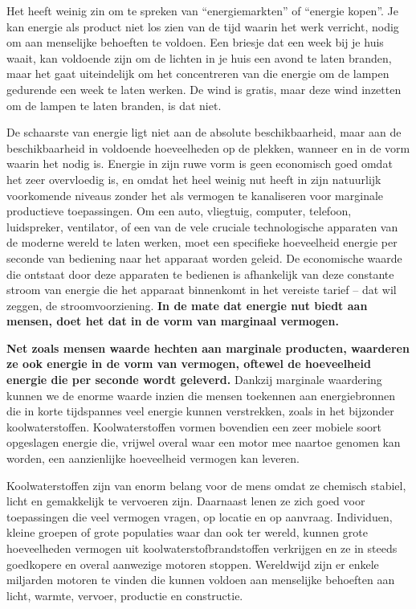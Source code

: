 Het heeft weinig zin om te spreken van ``energiemarkten'' of ``energie kopen''. Je kan energie als product niet los zien van de tijd waarin het werk verricht, nodig om aan menselijke behoeften te voldoen. Een briesje dat een week bij je huis waait, kan voldoende zijn om de lichten in je huis een avond te laten branden, maar het gaat uiteindelijk om het concentreren van die energie om de lampen gedurende een week te laten werken. De wind is gratis, maar deze wind inzetten om de lampen te laten branden, is dat niet.

De schaarste van energie ligt niet aan de absolute beschikbaarheid, maar aan de beschikbaarheid in voldoende hoeveelheden op de plekken, wanneer en in de vorm waarin het nodig is. Energie in zijn ruwe vorm is geen economisch goed omdat het zeer overvloedig is, en omdat het heel weinig nut heeft in zijn natuurlijk voorkomende niveaus zonder het als vermogen te kanaliseren voor marginale productieve toepassingen. Om een auto, vliegtuig, computer, telefoon, luidspreker, ventilator, of een van de vele cruciale technologische apparaten van de moderne wereld te laten werken, moet een specifieke hoeveelheid energie per seconde van bediening naar het apparaat worden geleid. De economische waarde die ontstaat door deze apparaten te bedienen is afhankelijk van deze constante stroom van energie die het apparaat binnenkomt in het vereiste tarief -- dat wil zeggen, de stroomvoorziening. \textbf{In de mate dat energie nut biedt aan mensen, doet het dat in de vorm van marginaal vermogen.}

\textbf{Net zoals mensen waarde hechten aan marginale producten, waarderen ze ook energie in de vorm van vermogen, oftewel de hoeveelheid energie die per seconde wordt geleverd.} Dankzij marginale waardering kunnen we de enorme waarde inzien die mensen toekennen aan energiebronnen die in korte tijdspannes veel energie kunnen verstrekken, zoals in het bijzonder koolwaterstoffen. Koolwaterstoffen vormen bovendien een zeer mobiele soort opgeslagen energie die, vrijwel overal waar een motor mee naartoe genomen kan worden, een aanzienlijke hoeveelheid vermogen kan leveren.

Koolwaterstoffen zijn van enorm belang voor de mens omdat ze chemisch stabiel, licht en gemakkelijk te vervoeren zijn. Daarnaast lenen ze zich goed voor toepassingen die veel vermogen vragen, op locatie en op aanvraag. Individuen, kleine groepen of grote populaties waar dan ook ter wereld, kunnen grote hoeveelheden vermogen uit koolwaterstofbrandstoffen verkrijgen en ze in steeds goedkopere en overal aanwezige motoren stoppen. Wereldwijd zijn er enkele miljarden motoren te vinden die kunnen voldoen aan menselijke behoeften aan licht, warmte, vervoer, productie en constructie.

